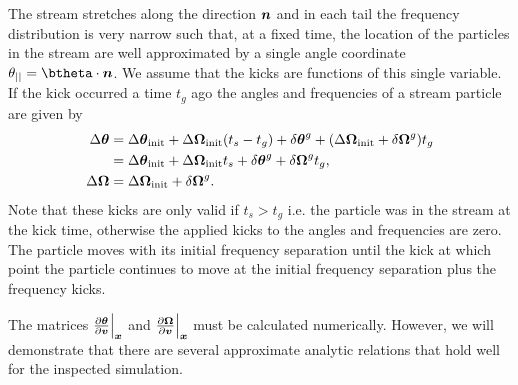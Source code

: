 \documentclass[useAMS,usenatbib,fleqn,a4paper]{mn2e}
\newcommand{\bs}[1]{\bmath{#1}}
\begin{document}
The stream stretches along the direction $\bs{n}$ and in each tail the frequency distribution is very narrow such that, at a fixed time, the location of the particles in the stream are well approximated by a single angle coordinate $\theta_{||}=\btheta\cdot\bs{n}$. We assume that the kicks are functions of this single variable. If the kick occurred a time $t_g$ ago the angles and frequencies of a stream particle are given by
\begin{equation}\label{linearkickevol}
\begin{split}
\Delta\bs{\theta} &= \Delta\bs{\theta}_{\rm init}+\Delta\boldsymbol{\Omega}_{\rm init}(t_s-t_g)+\delta\bs{\theta}^g+(\Delta\boldsymbol{\Omega}_{\rm init}+\delta\boldsymbol{\Omega}^g)t_g \\&= \Delta\bs{\theta}_{\rm init}+\Delta\boldsymbol{\Omega}_{\rm init}t_s+\delta\bs{\theta}^g+\delta\boldsymbol{\Omega}^g t_g,\\
\Delta\boldsymbol{\Omega} &= \Delta\boldsymbol{\Omega}_{\rm init}+\delta\boldsymbol{\Omega}^g.
\end{split}
\end{equation}
Note that these kicks are only valid if $t_s>t_g$ i.e. the particle was in the stream at the kick time, otherwise the applied kicks to the angles and frequencies are zero.
The particle moves with its initial frequency separation until the kick at which point the particle continues to move at the initial frequency separation plus the frequency kicks.

The matrices $\frac{\upartial \bs{\theta}}{\upartial \bs{v}}\Big|_{\bs{x}}$ and $\frac{\upartial \bs{\Omega}}{\upartial \bs{v}}\Big|_{\bs{x}}$ must be calculated numerically. However, we will demonstrate that there are several approximate analytic relations that hold well for the inspected simulation.
\end{document}

